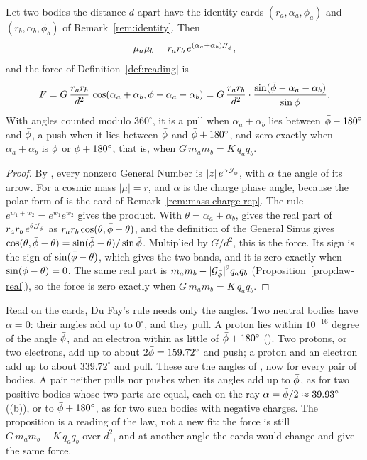 \begin{proposition}\label{prop:law-cards}
Let two bodies the distance $d$ apart have the identity cards $(r_a, \alpha_a, \phi_a)$ and $(r_b, \alpha_b, \phi_b)$ of Remark~\ref{rem:identity}. Then
\[
\mu_a\mu_b = r_a r_b\,e^{(\alpha_a + \alpha_b)\mathcal{J}_{\bar{\phi}}} ,
\]
and the force of Definition~\ref{def:reading} is
\[
F = G\,\frac{r_a r_b}{d^2}\,\cos(\alpha_a + \alpha_b, \bar{\phi} - \alpha_a - \alpha_b) = G\,\frac{r_a r_b}{d^2}\cdot\frac{\sin(\bar{\phi} - \alpha_a - \alpha_b)}{\sin\bar{\phi}} .
\]
With angles counted modulo $360^\circ$, it is a pull when $\alpha_a + \alpha_b$ lies between $\bar{\phi} - 180^\circ$ and $\bar{\phi}$, a push when it lies between $\bar{\phi}$ and $\bar{\phi} + 180^\circ$, and zero exactly when $\alpha_a + \alpha_b$ is $\bar{\phi}$ or $\bar{\phi} + 180^\circ$, that is, when $G\,m_a m_b = K\,q_a q_b$.
\end{proposition}

\begin{proof}
By , every nonzero General Number is $|z|\,e^{\alpha\mathcal{J}_{\bar{\phi}}}$, with $\alpha$ the angle of its arrow. For a cosmic mass $|\mu| = r$, and $\alpha$ is the charge phase angle, because the polar form of  is the card of Remark~\ref{rem:mass-charge-rep}. The rule $e^{w_1 + w_2} = e^{w_1}e^{w_2}$ gives the product. With $\theta = \alpha_a + \alpha_b$,  gives the real part of $r_a r_b\,e^{\theta\mathcal{J}_{\bar{\phi}}}$ as $r_a r_b\cos(\theta, \bar{\phi} - \theta)$, and the definition of the General Sinus gives $\cos(\theta, \bar{\phi} - \theta) = \sin(\bar{\phi} - \theta)/\sin\bar{\phi}$. Multiplied by $G/d^2$, this is the force. Its sign is the sign of $\sin(\bar{\phi} - \theta)$, which gives the two bands, and it is zero exactly when $\sin(\bar{\phi} - \theta) = 0$. The same real part is $m_a m_b - |\mathcal{G}_{\bar{\phi}}|^2 q_a q_b$ (Proposition~\ref{prop:law-real}), so the force is zero exactly when $G\,m_a m_b = K\,q_a q_b$.
\end{proof}

Read on the cards, Du Fay's rule needs only the angles. Two neutral bodies have $\alpha = 0$: their angles add up to $0^\circ$, and they pull. A proton lies within $10^{-16}$ degree of the angle $\bar{\phi}$, and an electron within as little of $\bar{\phi} + 180^\circ$ (). Two protons, or two electrons, add up to about $2\bar{\phi} = 159.72^\circ$ and push; a proton and an electron add up to about $339.72^\circ$ and pull. These are the angles of , now for every pair of bodies. A pair neither pulls nor pushes when its angles add up to $\bar{\phi}$, as for two positive bodies whose two parts are equal, each on the ray $\alpha = \bar{\phi}/2 \approx 39.93^\circ$ ((b)), or to $\bar{\phi} + 180^\circ$, as for two such bodies with negative charges. The proposition is a reading of the law, not a new fit: the force is still $G\,m_a m_b - K\,q_a q_b$ over $d^2$, and at another angle the cards would change and give the same force.

